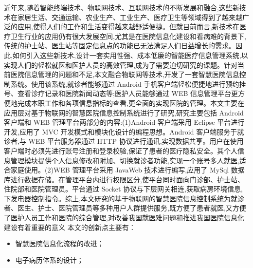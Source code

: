 \documentclass[doctor,secret]{thuthesis}
\begin{document}
\begin{cabstract}
近年来,随着智能终端技术、物联网技术、互联网技术的不断发展和融合,这些新技术在家居生活、交通运输、农业生产、工业生产、医疗卫生等领域得到了越来越广泛的应用,使得人们的工作和生活变得越来越舒适便捷。但就目前而言,新技术在医疗卫生行业的应用仍有很大发展空间,尤其是在医院信息化建设和看病难的背景下,传统的护士站、医生站等固定信息点的功能已无法满足人们日益增长的需求。因此,如何引入这些新技术,设计一套实用性强、成本低廉的智能医疗信息管理系统,以实现人们的轻松就医和医护人员的高效管理,成为了需要迫切研究的课题。针对当前医院信息管理的问题和不足,本文融合物联网等技术,开发了一套智慧医院信息控制系统。使用该系统,就诊者能够通过 Android 手机客户端轻松便捷地进行预约挂号、查看诊疗记录和医院新闻动态等;医护人员能够通过 WEB 信息管理平台更方便地完成本职工作和各项信息指标的查看,更全面的实现医院的管理。本文主要在应用层对基于物联网的智慧医院信息控制系统进行了研究,研究主要包括 Android 客户端和 WEB 管理平台两部分的内容:(1)Android 客户端采用 Eclipse 平台进行开发,应用了 MVC 开发模式和模块化设计的编程思想。Android 客户端服务于就诊者,与 WEB 平台服务器通过 HTTP 协议进行通讯,实现数据共享。用户在使用客户端时必须先进行账号注册和登录校验,保证了患者的医疗隐私安全。其个人信息管理模块提供个人信息修改和附加、切换就诊者功能,实现一个账号多人就医,适合家庭使用。(2)WEB 管理平台采用 JavaWeb 技术进行编写,应用了 MySql 数据库进行数据存储。在管理平台内进行权限区分,使平台同时面向门诊部、护士站、住院部和医院管理员。平台通过 Socket 协议与下层网关相连,获取病房环境信息,下发电器控制指令。综上,本文研究的基于物联网的智慧医院信息控制系统为就诊者、医生、护士、医院管理员等多种用户人群提供服务,既方便了患者就医,又方便了医护人员工作和医院的综合管理,对改善我国就医难问题和推进我国医院信息化建设有着重要的意义
本文的创新点主要有：
\begin{itemize}
\item 智慧医院信息化流程的改进；
\item 电子病历体系的设计；
\end{itemize}


\end{cabstract}


\begin{eabstract}

\end{eabstract}

\makecover
\tableofcontents
\end{document}
